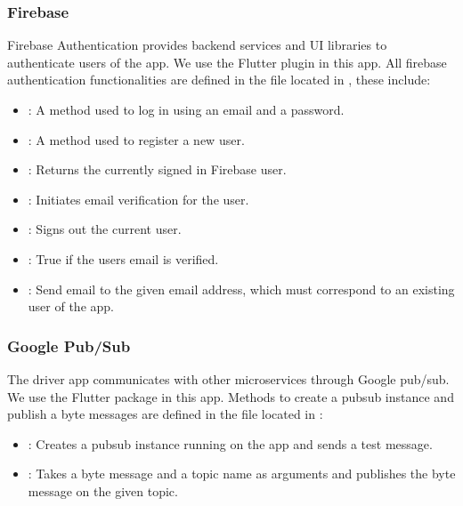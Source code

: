 \documentclass[letterpaper,10pt,english]{sphinxmanual}
\begin{document}
\subsubsection{Firebase}
\label{\detokenize{microservices/driver_app/services:firebase}}
Firebase Authentication provides backend services and UI libraries to authenticate users of the app.
We use the Flutter plugin  in this app.
All firebase authentication functionalities are defined in the file  located in , these include:
\begin{itemize}
\item {} 
: A method used to log in using an email and a password.

\item {} 
: A method used to register a new user.

\item {} 
: Returns the currently signed in Firebase user.

\item {} 
: Initiates email verification for the user.

\item {} 
: Signs out the current user.

\item {} 
: True if the users email is verified.

\item {} 
: Send email to the given email address, which must correspond to an existing user of the app.

\end{itemize}


\subsubsection{Google Pub/Sub}
\label{\detokenize{microservices/driver_app/services:google-pub-sub}}
The driver app communicates with other microservices through Google pub/sub.
We use the Flutter package  in this app.
Methods to create a pubsub instance and publish a byte messages are defined in the file  located in :
\begin{itemize}
\item {} 
: Creates a pubsub instance running on the app and sends a test message.

\item {} 
: Takes a byte message and a topic name as arguments and publishes the byte message on the given topic.

\end{itemize}
\end{document}
